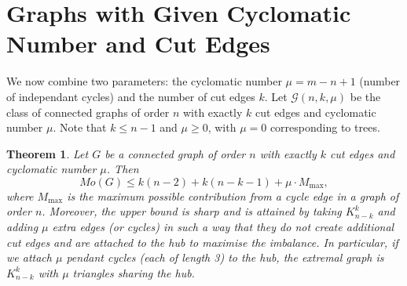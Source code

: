 \documentclass[12pt,a4paper]{article}
\newtheorem{theorem}{Theorem}[section]
\theoremstyle{definition}
\begin{document}
\section{Graphs with Given Cyclomatic Number and Cut Edges}\label{sec:cyclomatic}

We now combine two parameters: the cyclomatic number \(\mu = m-n+1\) (number of independant cycles) and the number of cut edges \(k\). Let \(\mathcal{G}(n,k,\mu)\) be the class of connected graphs of order \(n\) with exactly \(k\) cut edges and cyclomatic number \(\mu\). Note that \(k \le n-1\) and \(\mu \ge 0\), with \(\mu = 0\) corresponding to trees.

\begin{theorem}\label{thm:cyclomatic}
Let \(G\) be a connected graph of order \(n\) with exactly \(k\) cut edges and cyclomatic number \(\mu\). Then
\[
Mo(G) \le k(n-2) + k(n-k-1) + \mu \cdot M_{\max},
\]
where \(M_{\max}\) is the maximum possible contribution from a cycle edge in a graph of order \(n\). Moreover, the upper bound is sharp and is attained by taking \(K_{n-k}^k\) and adding \(\mu\) extra edges (or cycles) in such a way that they do not create additional cut edges and are attached to the hub to maximise the imbalance. In particular, if we attach \(\mu\) pendant cycles (each of length 3) to the hub, the extremal graph is \(K_{n-k}^k\) with \(\mu\) triangles sharing the hub.
\end{theorem}
\end{document}
